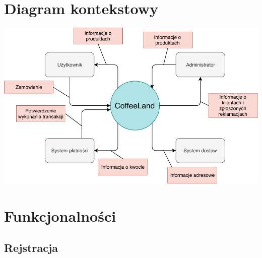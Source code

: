 \documentclass[12pt]{report}
\begin{document}
	\chapter{Diagram kontekstowy}
	\begin{center}
		\includegraphics[width=400pt]{kontekstowy.pdf}
	\end{center}
	
	\chapter{Funkcjonalności}
	
	
\section{Rejstracja}
\end{document}
